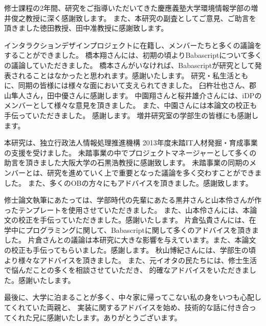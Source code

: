 \begin{acknowledgment}

修士課程の2年間、研究をご指導いただいてきた慶應義塾大学環境情報学部の増井俊之教授に深く感謝致します。
また、本研究の副査としてご意見、ご助言を頂きました徳田教授、田中准教授に感謝致します。

インタラクションデザインプロジェクトに在籍し、メンバーたちと多くの議論をすることができました。
橋本翔さんには、初期の頃よりBabascriptについて多くの議論していただきました。
橋本さんがいなければ、Babascriptが研究として発表されることはなかったと思われます。感謝いたします。
研究・私生活ともに、同期の皆様には様々な面において支えられてきました。
臼杵壮也さん、郡山隼人さん，田中優さんに感謝します。
中園翔さんと桜井雄介さんには、iDPのメンバーとして様々な意見を頂きました。
また、中園さんには本論文の校正も手伝っていただきました。
感謝します。
増井研究室の学部生の皆様にも感謝します。

本研究は、独立行政法人情報処理推進機構 2013年度未踏IT人材発掘・育成事業の支援を受けました。
未踏事業の中でプロジェクトマネージャーとして多くの助言を頂きました大阪大学の石黒浩教授に感謝致します。
未踏事業の同期のメンバーとは、研究を進めていく上で重要となった議論を多く交わすことができました。
また、多くのOBの方々にもアドバイスを頂きました。感謝致します。

修士論文執筆にあたっては、学部時代の先輩にあたる黒井さんと山本伶さんが作ったテンプレートを使用させていただきました。
また、山本伶さんには、本論文の校正を手伝っていただきました。感謝いたします。
片倉弘貴さんには、在学中にプログラミングに関して、Babascriptに関して多くのアドバイスを頂きました。
片倉さんとの議論は本研究に大きな影響を与えています。また、本論文の校正も手伝ってもらいました。感謝します。
秋山博紀さんには、学部生の頃より様々なアドバイスを頂きました。
また、元イオタの民たちには、修士生活で悩んだことの多くを相談させていただき、
的確なアドバイスをいただきました。感謝いたします。

最後に、大学に泊まることが多く、中々家に帰ってこない私の身をいつも心配してくれていた両親と、
実装に関するアドバイスを始め、技術的な話に付き合ってくれた兄に感謝いたします。ありがとうございます。

\end{acknowledgment}
